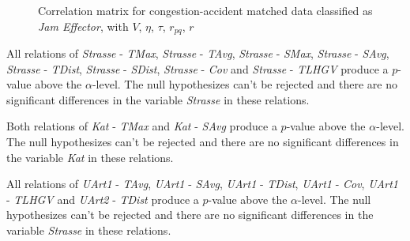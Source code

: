 \begin{figure}[!ht]
	\centering
	\caption{Correlation matrix for congestion-accident matched data classified as \textit{Jam Effector}, with $V$, $\eta$, $\tau$, $r_{pq}$, $r$}
	\label{img:correlation_matrix_selected_effector_cramers}
\end{figure}

All relations of \textit{Strasse} - \textit{TMax}, \textit{Strasse} - \textit{TAvg}, \textit{Strasse} - \textit{SMax}, \textit{Strasse} - \textit{SAvg}, \textit{Strasse} - \textit{TDist}, \textit{Strasse} - \textit{SDist}, \textit{Strasse} - \textit{Cov} and \textit{Strasse} - \textit{TLHGV} produce a $p$-value above the $\alpha$-level. The null hypothesizes can't be rejected and there are no significant differences in the variable \textit{Strasse} in these relations.

Both relations of \textit{Kat} - \textit{TMax} and \textit{Kat} - \textit{SAvg} produce a $p$-value above the $\alpha$-level. The null hypothesizes can't be rejected and there are no significant differences in the variable \textit{Kat} in these relations.

All relations of \textit{UArt1} - \textit{TAvg}, \textit{UArt1} - \textit{SAvg}, \textit{UArt1} - \textit{TDist}, \textit{UArt1} - \textit{Cov}, \textit{UArt1} - \textit{TLHGV} and \textit{UArt2} - \textit{TDist} produce a $p$-value above the $\alpha$-level. The null hypothesizes can't be rejected and there are no significant differences in the variable \textit{Strasse} in these relations.

